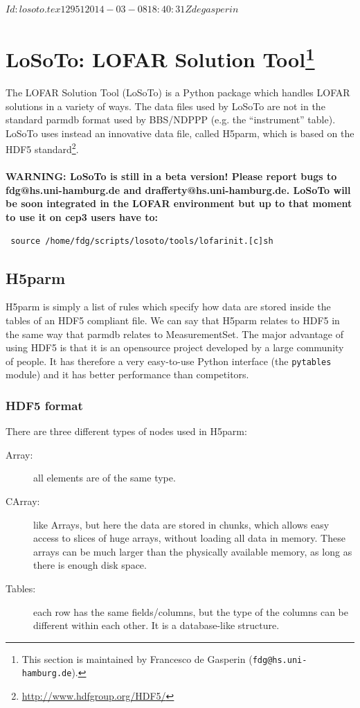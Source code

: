 \svnInfo $Id: losoto.tex 12951 2014-03-08 18:40:31Z degasperin $

\def \losoto {LoSoTo}

\section[LoSoTo: LOFAR Solution Tool]{\losoto: LOFAR Solution Tool\footnote{This section is maintained by Francesco de Gasperin ({\tt fdg@hs.uni-hamburg.de}).}}
\label{losoto}

The LOFAR Solution Tool (\losoto{}) is a Python package which handles LOFAR solutions in a variety of ways. The data files used by \losoto{} are not in the standard parmdb format used by BBS/NDPPP (e.g. the ``instrument'' table). \losoto{} uses instead an innovative data file, called H5parm, which is based on the HDF5 standard\footnote{\url{http://www.hdfgroup.org/HDF5/}}.
\\
\\
\textbf{WARNING: \losoto{} is still in a beta version! Please report bugs to fdg@hs.uni-hamburg.de and drafferty@hs.uni-hamburg.de. \losoto{} will be soon integrated in the LOFAR environment but up to that moment to use it on cep3 users have to:}
\begin{verbatim}
 source /home/fdg/scripts/losoto/tools/lofarinit.[c]sh
\end{verbatim}

\subsection{H5parm}
\label{losoto:h5parm}

H5parm is simply a list of rules which specify how data are stored inside the tables of an HDF5 compliant file. We can say that H5parm relates to HDF5 in the same way that parmdb relates to MeasurementSet. The major advantage of using HDF5 is that it is an opensource project developed by a large community of people. It has therefore a very easy-to-use Python interface (the \texttt{pytables} module) and it has better performance than competitors.

\subsubsection{HDF5 format}
\label{losoto:HDF5}

There are three different types of nodes used in H5parm:
\begin{description}
 \item[Array:] all elements are of the same type.
 \item[CArray:] like Arrays, but here the data are stored in chunks, which allows easy access to
slices of huge arrays, without loading all data in memory. These arrays can be much
larger than the physically available memory, as long as there is enough disk space.
 \item[Tables:] each row has the same fields/columns, but the type of the columns can be different within each other. It is a database-like structure.
\end{description}


